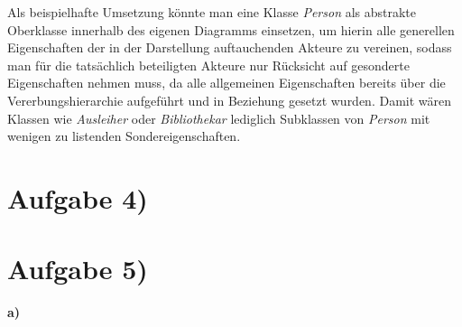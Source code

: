 \documentclass{swp1}
\begin{document}
Als beispielhafte Umsetzung könnte man eine Klasse \textit{Person} als abstrakte Oberklasse innerhalb des eigenen Diagramms einsetzen, um hierin alle generellen Eigenschaften der in der Darstellung auftauchenden Akteure zu vereinen, sodass man für die tatsächlich beteiligten Akteure nur Rücksicht auf gesonderte Eigenschaften nehmen muss, da alle allgemeinen Eigenschaften bereits über die Vererbungshierarchie aufgeführt und in Beziehung gesetzt wurden. Damit wären Klassen wie \emph{Ausleiher} oder \emph{Bibliothekar} lediglich Subklassen von \textit{Person} mit wenigen zu listenden Sondereigenschaften.

\section*{Aufgabe 4)}



\section*{Aufgabe 5)}

\textbf{a)}\newline
\end{document}
